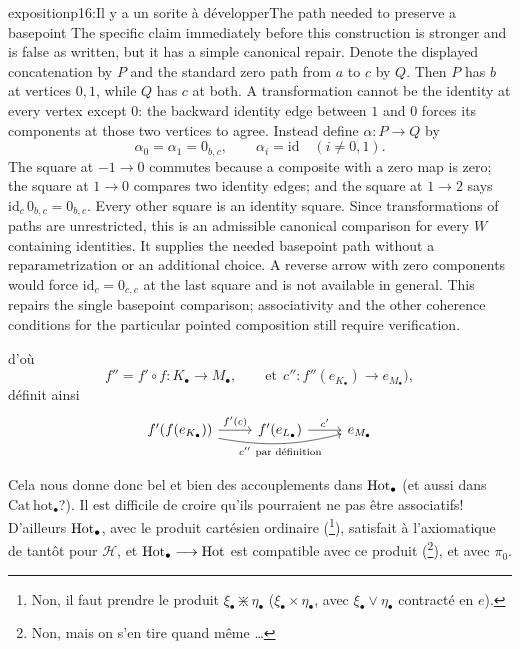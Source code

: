 \begin{dcomment}{exposition}{p16:Il y a un sorite à développer}{The path needed to preserve a basepoint}
The specific claim immediately before this construction is stronger and is false as written, but it has a simple canonical repair. Denote the displayed concatenation by $P$ and the standard zero path from $a$ to $c$ by $Q$. Then $P$ has $b$ at vertices $0,1$, while $Q$ has $c$ at both. A transformation cannot be the identity at every vertex except $0$: the backward identity edge between $1$ and $0$ forces its components at those two vertices to agree. Instead define $\alpha:P\to Q$ by
\[
 \alpha_0=\alpha_1=0_{b,c},\qquad
 \alpha_i=\mathrm{id}\quad(i\ne0,1).
\]
The square at $-1\to0$ commutes because a composite with a zero map is zero; the square at $1\to0$ compares two identity edges; and the square at $1\to2$ says $\mathrm{id}_c\,0_{b,c}=0_{b,c}$. Every other square is an identity square. Since transformations of paths are unrestricted, this is an admissible canonical comparison for every $W$ containing identities. It supplies the needed basepoint path without a reparametrization or an additional choice. A reverse arrow with zero components would force $\mathrm{id}_c=0_{c,c}$ at the last square and is not available in general. This repairs the single basepoint comparison; associativity and the other coherence conditions for the particular pointed composition still require verification.
\end{dcomment}



d'où
\[
f'' = f'\circ f : K_{\bullet} \longrightarrow M_{\bullet}, \qquad \text{et}\ \ c'' : f''(e_{K_{\bullet}}) \longrightarrow e_{M_{\bullet}}), %
\]
définit ainsi
\[
\begin{tikzcd}
f'(f(e_{K_{\bullet}})) \arrow[r, "f'(c)"] \arrow[rr, bend right=12, "{c''\ \text{par définition}}"'] & f'(e_{L_{\bullet}}) \arrow[r, "c'"] & e_{M_{\bullet}}
\end{tikzcd}
\]

\noindent{}Cela nous donne donc bel et bien des accouplements dans $\mathrm{Hot}_{\bullet}$ (et aussi dans $\mathrm{Cat\,hot}_{\bullet}$?). Il est difficile de croire qu'ils pourraient ne pas être associatifs! D'ailleurs $\mathrm{Hot}_{\bullet}$, avec le produit cartésien ordinaire (\footnote[4]{Non, il faut prendre le produit $\xi_{\bullet} \divideontimes \eta_{\bullet}$ ($\xi_{\bullet}\times\eta_{\bullet}$, avec $\xi_{\bullet}\vee\eta_{\bullet}$ contracté en $e$).}), satisfait à l'axiomatique de tantôt pour $\mathcal{H}$, et $\mathrm{Hot}_{\bullet} \longrightarrow \mathrm{Hot}$ est compatible avec ce produit (\footnote[5]{Non, mais on s'en tire quand même \ldots}), et avec $\pi_0$. %

